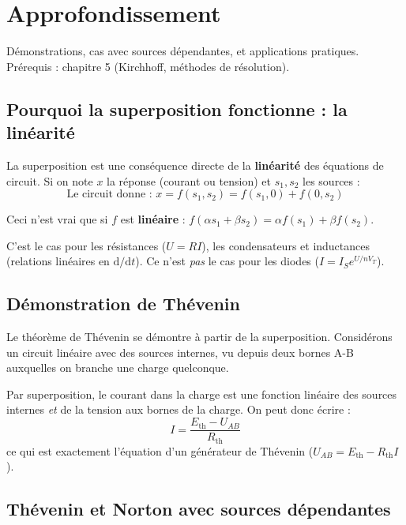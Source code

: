 \documentclass[12pt,a4paper,twoside]{book}
\begin{document}
\section{Approfondissement}

\begin{approfondissement}
Démonstrations, cas avec sources dépendantes, et applications pratiques. Prérequis : chapitre 5 (Kirchhoff, méthodes de résolution).
\end{approfondissement}

\subsection{Pourquoi la superposition fonctionne : la linéarité}

La superposition est une conséquence directe de la \textbf{linéarité} des équations de circuit. Si on note $x$ la réponse (courant ou tension) et $s_1, s_2$ les sources :
\[
\text{Le circuit donne : } x = f(s_1, s_2) = f(s_1, 0) + f(0, s_2)
\]

Ceci n'est vrai que si $f$ est \textbf{linéaire} : $f(\alpha s_1 + \beta s_2) = \alpha f(s_1) + \beta f(s_2)$.

C'est le cas pour les résistances ($U = RI$), les condensateurs et inductances (relations linéaires en $\mathrm{d}/\mathrm{d}t$). Ce n'est \textit{pas} le cas pour les diodes ($I = I_S e^{U/nV_T}$).

\subsection{Démonstration de Thévenin}

Le théorème de Thévenin se démontre à partir de la superposition. Considérons un circuit linéaire avec des sources internes, vu depuis deux bornes A-B auxquelles on branche une charge quelconque.

Par superposition, le courant dans la charge est une fonction linéaire des sources internes \textit{et} de la tension aux bornes de la charge. On peut donc écrire :
\[
I = \frac{E_{\text{th}} - U_{AB}}{R_{\text{th}}}
\]
ce qui est exactement l'équation d'un générateur de Thévenin ($U_{AB} = E_{\text{th}} - R_{\text{th}} I$).

\subsection{Thévenin et Norton avec sources dépendantes}
\end{document}
